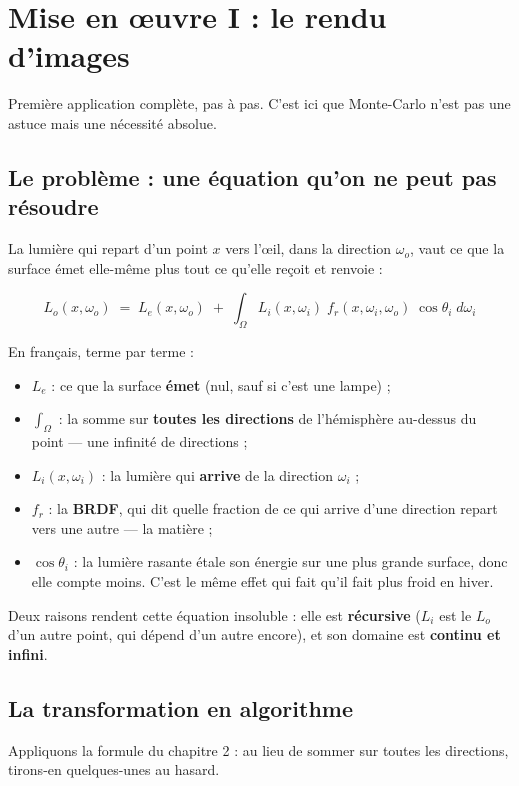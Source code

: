 \chapter{Mise en œuvre I : le rendu d'images}

Première application complète, pas à pas. C'est ici que Monte-Carlo n'est pas
une astuce mais une nécessité absolue.

\section{Le problème : une équation qu'on ne peut pas résoudre}

La lumière qui repart d'un point $x$ vers l'œil, dans la direction
$\omega_o$, vaut ce que la surface émet elle-même plus tout ce qu'elle reçoit
et renvoie :

\[ L_o(x,\omega_o) \;=\; L_e(x,\omega_o) \;+\;
   \int_{\Omega} L_i(x,\omega_i)\; f_r(x,\omega_i,\omega_o)\; \cos\theta_i \; d\omega_i \]

En français, terme par terme :

\begin{itemize}
  \item $L_e$ : ce que la surface \textbf{émet} (nul, sauf si c'est une lampe) ;
  \item $\int_{\Omega}$ : la somme sur \textbf{toutes les directions} de
        l'hémisphère au-dessus du point — une infinité de directions ;
  \item $L_i(x,\omega_i)$ : la lumière qui \textbf{arrive} de la direction
        $\omega_i$ ;
  \item $f_r$ : la \textbf{BRDF}, qui dit quelle fraction de ce qui arrive
        d'une direction repart vers une autre — la matière ;
  \item $\cos\theta_i$ : la lumière rasante étale son énergie sur une plus
        grande surface, donc elle compte moins. C'est le même effet qui fait
        qu'il fait plus froid en hiver.
\end{itemize}

Deux raisons rendent cette équation insoluble : elle est \textbf{récursive}
($L_i$ est le $L_o$ d'un autre point, qui dépend d'un autre encore), et son
domaine est \textbf{continu et infini}.

\section{La transformation en algorithme}

Appliquons la formule du chapitre 2 : au lieu de sommer sur toutes les
directions, tirons-en quelques-unes au hasard.

